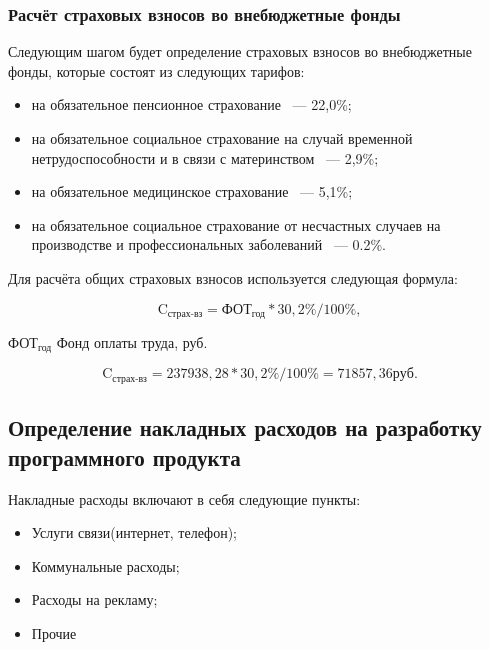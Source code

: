 \subsubsection{Расчёт страховых взносов во внебюджетные фонды}

Следующим шагом будет определение страховых взносов во внебюджетные фонды, которые состоят
из следующих тарифов:

\begin{itemize}
    \item на обязательное пенсионное страхование ~--- 22,0\%;
    \item на обязательное социальное страхование на случай временной нетрудоспособности и в связи с материнством ~--- 2,9\%;
    \item на обязательное медицинское страхование ~--- 5,1\%;
    \item на обязательное социальное страхование от несчастных случаев на производстве и профессиональных заболеваний ~--- 0.2\%.
\end{itemize}

Для расчёта общих страховых взносов используется следующая формула:

\begin{equation}
    \text{C}_\text{страх-вз} = \text{ФОТ}_\text{год} * 30,2\% / 100\%,
\end{equation}

\begin{eqexpl}[7ex]
    \item{$\text{ФОТ}_\text{год}$} Фонд оплаты труда, руб.
\end{eqexpl}

\begin{equation*}
    \text{C}_\text{страх-вз} = 237938,28 * 30,2\% / 100\% = 71857,36 руб.
\end{equation*}

\tocless\subsection{Определение накладных расходов на разработку программного продукта}

Накладные расходы включают в себя следующие пункты:

\begin{itemize}
    \item Услуги связи(интернет, телефон);
    \item Коммунальные расходы;
    \item Расходы на рекламу;
    \item Прочие
\end{itemize}


